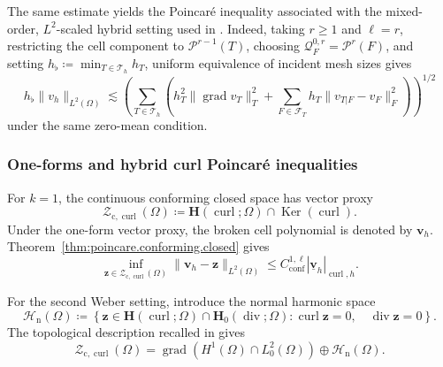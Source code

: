 \documentclass[a4paper,11pt]{article}
\theoremstyle{definition}
\newcommand{\Ker}{\operatorname{Ker}}
\begin{document}
The same estimate yields the Poincar\'e inequality associated with the mixed-order, $L^2$-scaled hybrid setting used in \cite[Eqs.~(31), (34), and~(50)]{Dalphin.Ducreux.Lemaire.Pitassi:25}.
Indeed, taking $r\geq1$ and $\ell=r$, restricting the cell component to $\mathcal P^{r-1}(T)$, choosing $\mathcal Q_F^{0,r}=\mathcal P^r(F)$, and setting $h_\flat\coloneqq\min_{T\in\mathcal T_h}h_T$, uniform equivalence of incident mesh sizes gives
\[
  h_\flat\|v_h\|_{L^2(\Omega)}
  \lesssim
  \left(
    \sum_{T\in\mathcal T_h}
    \left(
      h_T^2\|\operatorname{grad}v_T\|_T^2
      +
      \sum_{F\in\mathcal F_T}
      h_T\|v_{T|F}-v_F\|_F^2
    \right)
  \right)^{1/2}
\]
under the same zero-mean condition.

\subsubsection{One-forms and hybrid curl Poincar\'e inequalities}
\label{subsec:poincare.proxy.curl}

For $k=1$, the continuous conforming closed space has vector proxy
\[
  \boldsymbol{\mathcal Z}_{\mathrm c,\operatorname{curl}}(\Omega)
  \coloneqq
  \boldsymbol H(\operatorname{curl};\Omega)
  \cap
  \Ker(\operatorname{curl}).
\]
Under the one-form vector proxy, the broken cell polynomial is denoted by $\boldsymbol v_h$.
Theorem~\ref{thm:poincare.conforming.closed} gives
\begin{equation}
\label{eq:hybrid.curl.poincare.modulo.closed}
  \inf_{\boldsymbol z\in
    \boldsymbol{\mathcal Z}_{\mathrm c,\operatorname{curl}}(\Omega)}
  \|
    \boldsymbol v_h-\boldsymbol z
  \|_{L^2(\Omega)}
  \leq
  C_{\mathrm{conf}}^{1,\ell}
  |\underline{\boldsymbol v}_h|_{\operatorname{curl},h}.
\end{equation}

For the second Weber setting, introduce the normal harmonic space
\[
  \boldsymbol{\mathcal H}_{\mathrm n}(\Omega)
  \coloneqq
  \left\{
    \boldsymbol z
    \in
    \boldsymbol H(\operatorname{curl};\Omega)
    \cap
    \boldsymbol H_0(\operatorname{div};\Omega):
    \operatorname{curl}\boldsymbol z=0,
    \quad
    \operatorname{div}\boldsymbol z=0
  \right\}.
\]
The topological description recalled in \cite[Eq.~(12)]{Lemaire.Pitassi:25} gives
\begin{equation}
\label{eq:continuous.curl.kernel.decomposition}
  \boldsymbol{\mathcal Z}_{\mathrm c,\operatorname{curl}}(\Omega)
  =
  \operatorname{grad}
  \left(
    H^1(\Omega)\cap L_0^2(\Omega)
  \right)
  \oplus
  \boldsymbol{\mathcal H}_{\mathrm n}(\Omega).
\end{equation}
\end{document}
